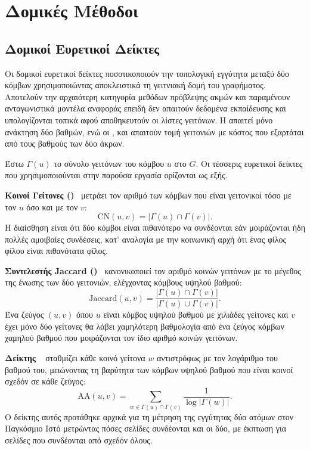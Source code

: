 \section{Δομικές Μέθοδοι}
\label{sec:structural-methods}

\subsection{Δομικοί Ευρετικοί Δείκτες}
\label{subsec:structural-heuristics}

Οι δομικοί ευρετικοί δείκτες ποσοτικοποιούν την τοπολογική εγγύτητα μεταξύ δύο κόμβων
χρησιμοποιώντας αποκλειστικά τη γειτνιακή δομή του γραφήματος.
Αποτελούν την αρχαιότερη
κατηγορία μεθόδων πρόβλεψης ακμών και παραμένουν ανταγωνιστικά μοντέλα αναφοράς
επειδή δεν απαιτούν δεδομένα εκπαίδευσης και υπολογίζονται τοπικά αφού
αποθηκευτούν οι λίστες γειτόνων.
Η  απαιτεί μόνο ανάκτηση δύο βαθμών,
ενώ οι ,  και  απαιτούν τομή γειτονιών με κόστος που
εξαρτάται από τους βαθμούς των δύο άκρων.

Έστω $\Gamma(u)$ το σύνολο γειτόνων του κόμβου $u$ στο $G$.
Οι τέσσερις
ευρετικοί δείκτες που χρησιμοποιούνται στην παρούσα εργασία ορίζονται ως εξής.

\textbf{Κοινοί Γείτονες ()}~\cite{newman2001clustering} μετράει τον αριθμό των κόμβων
που είναι γειτονικοί τόσο με τον $u$ όσο και με τον $v$:
\begin{equation}
    \mathrm{CN}(u, v) = |\Gamma(u) \cap \Gamma(v)|.
    \label{eq:cn}
\end{equation}
Η διαίσθηση είναι ότι δύο κόμβοι είναι πιθανότερο να συνδέονται εάν μοιράζονται ήδη
πολλές αμοιβαίες συνδέσεις, κατ' αναλογία με την κοινωνική αρχή ότι ένας φίλος
φίλου είναι πιθανότατα φίλος.

\textbf{Συντελεστής Jaccard ()}~\cite{jaccard1912distribution} κανονικοποιεί τον αριθμό
κοινών γειτόνων με το μέγεθος της ένωσης των δύο γειτονιών, ελέγχοντας κόμβους
υψηλού βαθμού:
\begin{equation}
    \mathrm{Jaccard}(u, v) = \frac{|\Gamma(u) \cap \Gamma(v)|}{|\Gamma(u) \cup \Gamma(v)|}.
    \label{eq:jaccard}
\end{equation}
Ένα ζεύγος $(u, v)$ όπου $u$ είναι κόμβος υψηλού βαθμού με χιλιάδες γείτονες και $v$ έχει
μόνο δύο γείτονες θα λάβει χαμηλότερη βαθμολογία  από ένα ζεύγος κόμβων
χαμηλού βαθμού που μοιράζονται τον ίδιο αριθμό κοινών γειτόνων.

\textbf{Δείκτης }~\cite{adamic2003friends} σταθμίζει κάθε κοινό γείτονα
$w$ αντιστρόφως με τον λογάριθμο του βαθμού του, μειώνοντας τη βαρύτητα των κόμβων
υψηλού βαθμού που είναι κοινοί σχεδόν σε κάθε ζεύγος:
\begin{equation}
    \mathrm{AA}(u, v) = \sum_{w \in \Gamma(u) \cap \Gamma(v)} \frac{1}{\log |\Gamma(w)|}.
    \label{eq:aa}
\end{equation}
Ο δείκτης αυτός προτάθηκε αρχικά για τη μέτρηση της εγγύτητας δύο ατόμων στον
Παγκόσμιο Ιστό μετρώντας πόσες σελίδες συνδέονται και οι δύο, με έκπτωση για
σελίδες που συνδέονται από σχεδόν όλους.

